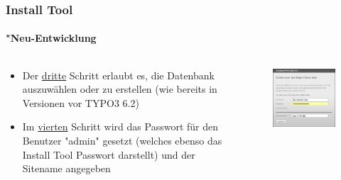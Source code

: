 
\begin{frame}[fragile]
	\frametitle{Install Tool}
	\framesubtitle{"Neu-Entwicklung}

	\begin{columns}[T]

		\begin{column}{.5\textwidth}
			\begin{itemize}
				\item Der \underline{dritte} Schritt erlaubt es, die Datenbank auszuwählen oder zu erstellen (wie bereits in Versionen vor TYPO3 6.2)
				\item Im \underline{vierten} Schritt wird das Passwort für den Benutzer "admin" gesetzt (welches ebenso das Install Tool Passwort darstellt) und der Sitename angegeben
			\end{itemize}
		\end{column}

		\begin{column}{.5\textwidth}
			\begin{figure}\vspace*{-0.4cm}
				\includegraphics[width=0.8\linewidth]{Images/InstallTool/AdminPasswordAndSiteName.png}
			\end{figure}
		\end{column}

	\end{columns}

\end{frame}

